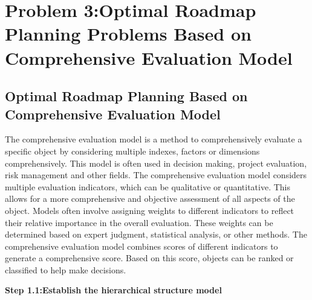 \documentclass[12pt]{article}
\begin{document}
\section{Problem 3:Optimal Roadmap Planning Problems Based on Comprehensive Evaluation Model}
\subsection{Optimal Roadmap Planning Based on Comprehensive Evaluation Model}
The comprehensive evaluation model is a method to comprehensively evaluate a specific object by considering multiple indexes, 
factors or dimensions comprehensively. This model is often used in decision making, project evaluation, risk management and other 
fields. The comprehensive evaluation model considers multiple evaluation indicators, which can be qualitative or quantitative. 
This allows for a more comprehensive and objective assessment of all aspects of the object. Models often involve assigning weights 
to different indicators to reflect their relative importance in the overall evaluation. These weights can be determined based on 
expert judgment, statistical analysis, or other methods. The comprehensive evaluation model combines scores of different indicators
to generate a comprehensive score. Based on this score, objects can be ranked or classified to help make decisions.


\textbf{Step 1.1:Establish the hierarchical structure model}
\end{document}
